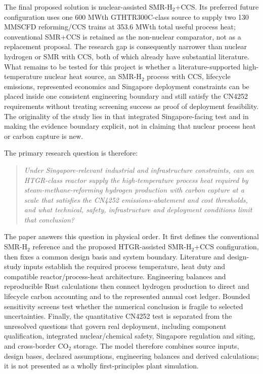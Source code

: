 The final proposed solution is nuclear-assisted SMR-H$_2$+CCS. Its preferred future configuration uses one 600 MWth GTHTR300C-class source to supply two 130 MMSCFD reforming/CCS trains at 353.6 MWth total useful process heat; conventional SMR+CCS is retained as the non-nuclear comparator, not as a replacement proposal. The research gap is consequently narrower than nuclear hydrogen or SMR with CCS, both of which already have substantial literature. What remains to be tested for this project is whether a literature-supported high-temperature nuclear heat source, an SMR-H$_2$ process with CCS, lifecycle emissions, represented economics and Singapore deployment constraints can be placed inside one consistent engineering boundary and still satisfy the CN4252 requirements without treating screening success as proof of deployment feasibility. The originality of the study lies in that integrated Singapore-facing test and in making the evidence boundary explicit, not in claiming that nuclear process heat or carbon capture is new.

The primary research question is therefore:

\begin{quote}
\emph{Under Singapore-relevant industrial and infrastructure constraints, can an HTGR-class reactor supply the high-temperature process heat required by steam-methane-reforming hydrogen production with carbon capture at a scale that satisfies the CN4252 emissions-abatement and cost thresholds, and what technical, safety, infrastructure and deployment conditions limit that conclusion?}
\end{quote}

The paper answers this question in physical order. It first defines the conventional SMR-H$_2$ reference and the proposed HTGR-assisted SMR-H$_2$+CCS configuration, then fixes a common design basis and system boundary. Literature and design-study inputs establish the required process temperature, heat duty and compatible reactor/process-heat architecture. Engineering balances and reproducible Rust calculations then connect hydrogen production to direct and lifecycle carbon accounting and to the represented annual cost ledger. Bounded sensitivity screens test whether the numerical conclusion is fragile to selected uncertainties. Finally, the quantitative CN4252 test is separated from the unresolved questions that govern real deployment, including component qualification, integrated nuclear/chemical safety, Singapore regulation and siting, and cross-border CO$_2$ storage. The model therefore combines source inputs, design bases, declared assumptions, engineering balances and derived calculations; it is not presented as a wholly first-principles plant simulation.